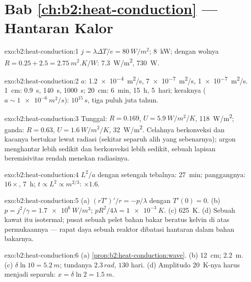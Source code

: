 \section*{Bab \ref{ch:b2:heat-conduction} --- Hantaran Kalor}

\begin{solution}{exo:b2:heat-conduction:1}
$j = \lambda\Delta T/e = \qty{80}{W/m^2}$; \qty{8}{kW}; dengan wolnya $R = 0.25 + 2.5 =
\qty{2.75}{m^2.K/W}$: \qty{7.3}{W/m^2}, \qty{730}{W}.
\end{solution}

\begin{solution}{exo:b2:heat-conduction:2}
$a$: \qty{1.2e-4}{m^2/s}, \qty{7e-7}{m^2/s}, \qty{1e-7}{m^2/s}. \qty{1}{cm}:
\qty{0.9}{s}, \qty{140}{s}, \qty{1000}{s}; \qty{20}{cm}: \qty{6}{min}, \qty{15}{h},
\qty{5}{hari}; keraknya ($a \sim \qty{1e-6}{m^2/s}$): $10^{15}\,\unit{s}$, tiga puluh
juta tahun.
\end{solution}

\begin{solution}{exo:b2:heat-conduction:3}
Tunggal: $R = 0.169$, $U = \qty{5.9}{W/m^2/K}$, \qty{118}{W/m^2}; ganda: $R =
0.63$, $U = \qty{1.6}{W/m^2/K}$, \qty{32}{W/m^2}. Celahnya berkonveksi dan kacanya
bertukar lewat radiasi (sekitar separuh alih yang sebenarnya); argon menghantar
lebih sedikit dan berkonveksi lebih sedikit, sebuah lapisan beremisivitas rendah menekan
radiasinya.
\end{solution}

\begin{solution}{exo:b2:heat-conduction:4}
$L^2/a$ dengan setengah tebalnya: \qty{27}{min}; panggangnya: $16\times$, \qty{7}{h};
$t \propto L^2 \propto m^{2/3}$: $\times 1.6$.
\end{solution}

\begin{solution}{exo:b2:heat-conduction:5}
(a) $(rT')'/r = -p/\lambda$ dengan $T'(0) = 0$. (b) $p = j^2/\gamma = \qty{1.7e6}{W/m^3}$;
$pR^2/4\lambda = \qty{1e-3}{K}$. (c) \qty{625}{K}. (d) Sebuah kawat itu isotermal; pusat
sebuah pelet bahan bakar beratus kelvin di atas permukaannya --- rapat daya
sebuah reaktor dibatasi hantaran dalam bahan bakarnya.
\end{solution}

\begin{solution}{exo:b2:heat-conduction:6}
(a) \cref{prop:b2:heat-conduction:wave}. (b) \qty{12}{cm}; \qty{2.2}{m}. (c)
$\delta\ln 10 = \qty{5.2}{m}$; tundanya $2.3\,\unit{rad}$, $130$ hari. (d) Amplitudo
\qty{20}{K}-nya harus menjadi separuh: $x = \delta\ln 2 = \qty{1.5}{m}$.
\end{solution}


